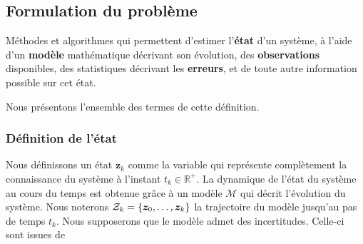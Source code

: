 \subsection{Formulation du problème}

\begin{definition}
    Méthodes et algorithmes qui permettent d’estimer l’\textbf{état} d’un système, à l’aide d’un \textbf{modèle} mathématique décrivant son évolution, des \textbf{observations} disponibles, des statistiques décrivant les \textbf{erreurs}, et de toute autre information possible sur cet état.
\end{definition}

Nous présentons l'ensemble des termes de cette définition.

\subsubsection{Définition de l'état}

Nous définissons un état $\bm z_k$ comme la variable qui représente complètement la connaissance du système à l'instant $t_k \in \mathbb R^+$. La dynamique de l'état du système au cours du temps est obtenue grâce à un modèle $\mathcal{M}$ qui décrit l'évolution du système.
Nous noterons $\mathcal Z_k = \{\bm z_0, \dots, \bm z_k\}$ la trajectoire du modèle jusqu'au pas de temps $t_k$.
Nous supposerons que le modèle admet des incertitudes. Celle-ci sont issues de

